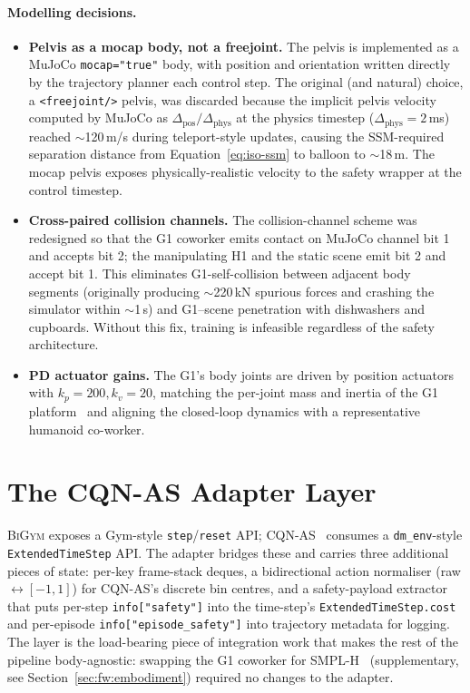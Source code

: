 \documentclass[11pt,a4paper]{report}
\newcommand{\ssm}{SSM}
\newcommand{\bigym}{\textsc{BiGym}}
\newcommand{\cqnas}{CQN-AS}
\begin{document}
\paragraph{Modelling decisions.}

\begin{itemize}[topsep=2pt,itemsep=2pt]
\item \textbf{Pelvis as a mocap body, not a freejoint.}
  The pelvis is implemented as a MuJoCo \texttt{mocap="true"} body,
  with position and orientation written directly by the trajectory
  planner each control step. The original (and natural) choice,
  a \texttt{<freejoint/>} pelvis, was discarded because the
  implicit pelvis velocity computed by MuJoCo as
  $\Delta_{\mathrm{pos}} / \Delta_{\mathrm{phys}}$ at the physics
  timestep ($\Delta_{\mathrm{phys}} = 2$\,ms) reached $\sim$120\,m/s
  during teleport-style updates, causing the \ssm{}-required
  separation distance from Equation~\ref{eq:iso-ssm} to balloon to
  $\sim$18\,m. The mocap pelvis exposes physically-realistic velocity
  to the safety wrapper at the control timestep.
\item \textbf{Cross-paired collision channels.}
  The collision-channel scheme was redesigned so that the G1
  coworker emits contact on MuJoCo channel bit 1 and accepts bit 2;
  the manipulating H1 and the static scene emit bit 2 and accept
  bit 1. This eliminates G1-self-collision between adjacent body
  segments (originally producing $\sim$220\,kN spurious forces and
  crashing the simulator within $\sim$1\,s) and G1--scene
  penetration with dishwashers and cupboards. Without this fix,
  training is infeasible regardless of the safety architecture.
\item \textbf{PD actuator gains.}
  The G1's body joints are driven by position actuators with
  $k_p = 200, k_v = 20$, matching the per-joint mass and inertia
  of the G1 platform~\cite{unitree_g1} and aligning the closed-loop
  dynamics with a representative humanoid co-worker.
\end{itemize}

\section{The \cqnas{} Adapter Layer}
\label{sec:bench:adapter}

\bigym{} exposes a Gym-style \texttt{step}/\texttt{reset} API;
\cqnas{}~\cite{seo2024cqnas} consumes a \texttt{dm\_env}-style
\texttt{ExtendedTimeStep} API. The adapter bridges these and carries
three additional pieces of state: per-key frame-stack deques, a
bidirectional action normaliser (raw $\leftrightarrow [-1,1]$) for
\cqnas{}'s discrete bin centres, and a safety-payload extractor that
puts per-step \texttt{info["safety"]} into the time-step's
\texttt{ExtendedTimeStep.cost} and per-episode
\texttt{info["episode\_safety"]} into trajectory metadata for
logging. The layer is the load-bearing piece of integration work
that makes the rest of the pipeline body-agnostic: swapping the G1
coworker for SMPL-H~\cite{romero2017smplh} (supplementary, see
Section~\ref{sec:fw:embodiment}) required no changes to the adapter.
\end{document}
